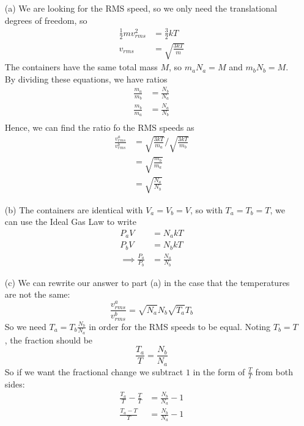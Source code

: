 \documentclass{article}
\begin{document}
\begin{itemize}
	\item[(a)] We are looking for the RMS speed, so we only need the translational degrees of freedom, so
	\begin{align*}
	\frac{1}{2}mv_{rms}^2 &= \frac{3}{2}kT \\
	v_{rms} &= \sqrt{\frac{3kT}{m}}
	\end{align*}
	The containers have the same total mass $M$, so $m_aN_a = M$ and $m_bN_b = M$. By dividing these equations, we have ratios
	\begin{align*}
	\frac{m_a}{m_b} &= \frac{N_b}{N_a} \\
	\frac{m_b}{m_a} &= \frac{N_a}{N_b} \\
	\end{align*}
	Hence, we can find the ratio fo the RMS speeds as
	\begin{align*}
	\frac{v_{rms}^a}{v_{rms}^b} &= \sqrt{\frac{3kT}{m_a}}/\sqrt{\frac{3kT}{m_b}} \\
	&= \sqrt{\frac{m_b}{m_a}} \\
	&= \sqrt{\frac{N_a}{N_b}}
	\end{align*}
	\item[(b)] The containers are identical with $V_a = V_b = V$, so with $T_a = T_b = T$, we can use the Ideal Gas Law to write
	\begin{align*}
	P_a V &= N_a k T \\
	P_b V &= N_b k T \\
	\implies \frac{P_a}{P_b} &= \frac{N_a}{N_b}
	\end{align*}
	\item[(c)] We can rewrite our answer to part (a) in the case that the temperatures are not the same:
	\begin{equation}
	\frac{v_{rms}^a}{v_{rms}^b} = \sqrt{N_a}{N_b}\sqrt{T_a}{T_b}
	\end{equation}
	So we need $T_a = T_b\frac{N_b}{N_a}$ in order for the RMS speeds to be equal. Noting $T_b = T$, the fraction should be
	\begin{equation}
	\frac{T_a}{T} = \frac{N_b}{N_a}
	\end{equation}
	So if we want the fractional change we subtract $1$ in the form of $\frac{T}{T}$ from both sides:
	\begin{align*}
	\frac{T_a}{T}-\frac{T}{T} &= \frac{N_b}{N_a}-1 \\
	\frac{T_a-T}{T} &= \frac{N_b}{N_a}-1
	\end{align*}
\end{itemize}
\end{document}
